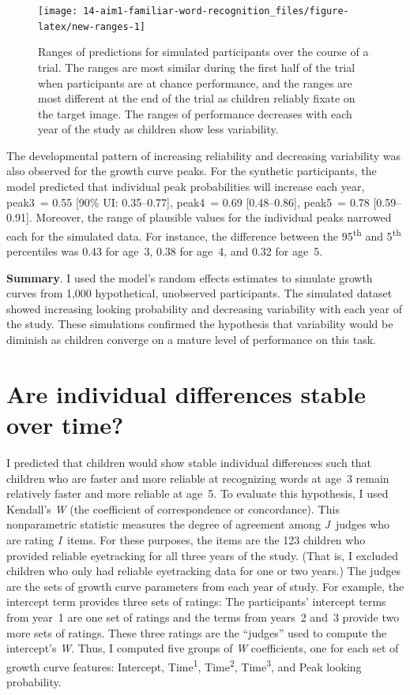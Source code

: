 \documentclass [11pt, proquest] {uwthesis}[2015/03/03]
\begin{document}
\begin{figure}
\texttt{[image: 14-aim1-familiar-word-recognition\_files/figure-latex/new-ranges-1]} \caption{Ranges of predictions for simulated participants over
the course of a trial. The ranges are most similar during the first half
of the trial when participants are at chance performance, and the ranges
are most different at the end of the trial as children reliably fixate
on the target image. The ranges of performance decreases with each year
of the study as children show less variability.}\label{fig:new-ranges}
\end{figure}
The developmental pattern of increasing reliability and decreasing
variability was also observed for the growth curve peaks. For the
synthetic participants, the model predicted that individual peak
probabilities will increase each year, peak3~= 0.55 {[}90\% UI:
0.35--0.77{]}, peak4~= 0.69 {[}0.48--0.86{]}, peak5~= 0.78
{[}0.59--0.91{]}. Moreover, the range of plausible values for the
individual peaks narrowed each for the simulated data. For instance, the
difference between the 95\textsuperscript{th} and 5\textsuperscript{th}
percentiles was 0.43 for age~3, 0.38 for age~4, and 0.32 for age~5.

\textbf{Summary}. I used the model's random effects estimates to
simulate growth curves from 1,000 hypothetical, unobserved participants.
The simulated dataset showed increasing looking probability and
decreasing variability with each year of the study. These simulations
confirmed the hypothesis that variability would be diminish as children
converge on a mature level of performance on this task.

\section{Are individual differences stable over
time?}\label{are-individual-differences-stable-over-time}

I predicted that children would show stable individual differences such
that children who are faster and more reliable at recognizing words at
age~3 remain relatively faster and more reliable at age~5. To evaluate
this hypothesis, I used Kendall's \emph{W} (the coefficient of
correspondence or concordance). This nonparametric statistic measures
the degree of agreement among \emph{J}~judges who are rating
\emph{I}~items. For these purposes, the items are the 123 children who
provided reliable eyetracking for all three years of the study. (That
is, I excluded children who only had reliable eyetracking data for one
or two years.) The judges are the sets of growth curve parameters from
each year of study. For example, the intercept term provides three sets
of ratings: The participants' intercept terms from year~1 are one set of
ratings and the terms from years~2 and~3 provide two more sets of
ratings. These three ratings are the ``judges'' used to compute the
intercept's \emph{W}. Thus, I computed five groups of \emph{W}
coefficients, one for each set of growth curve features: Intercept,
Time\textsuperscript{1}, Time\textsuperscript{2},
Time\textsuperscript{3}, and Peak looking probability.
\end{document}
